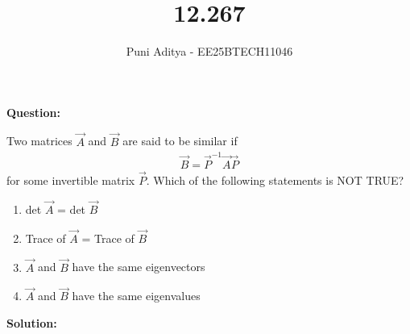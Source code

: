 \documentclass[journal]{IEEEtran}
\begin{document}
\title{12.267}
\author{Puni Aditya - EE25BTECH11046}
\maketitle

\textbf{Question:}

Two matrices $\vec{A}$ and $\vec{B}$ are said to be similar if 
\begin{align*}
    \vec{B} = \vec{P}^{-1} \vec{A}\vec{P}
\end{align*}
for some invertible matrix $\vec{P}$. Which of the following statements is NOT TRUE?
\begin{enumerate}
    \item det $\vec{A}$ = det $\vec{B}$
    \item Trace of $\vec{A}$ = Trace of $\vec{B}$
    \item $\vec{A}$ and $\vec{B}$ have the same eigenvectors
    \item $\vec{A}$ and $\vec{B}$ have the same eigenvalues
\end{enumerate}

\textbf{Solution:}
\end{document}
